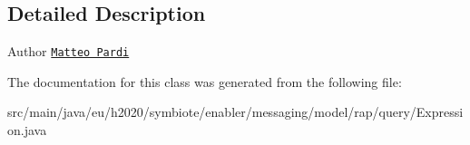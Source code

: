 \subsection{Detailed Description}
\begin{DoxyAuthor}{Author}
\href{mailto:m.pardi@nextworks.it}{\tt Matteo Pardi} 
\end{DoxyAuthor}


The documentation for this class was generated from the following file\+:\begin{DoxyCompactItemize}
\item 
src/main/java/eu/h2020/symbiote/enabler/messaging/model/rap/query/Expression.\+java\end{DoxyCompactItemize}
